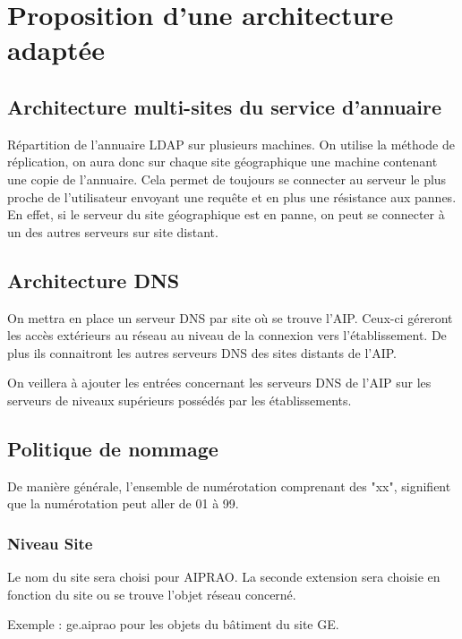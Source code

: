 \section{Proposition d'une architecture adaptée}




\subsection{Architecture multi-sites du service d'annuaire}

Répartition de l'annuaire LDAP sur plusieurs machines. On utilise la méthode de
réplication, on aura donc sur chaque site géographique une machine contenant 
une copie de l'annuaire. Cela permet de toujours se connecter au serveur le 
plus proche de l'utilisateur envoyant une requête et en plus une résistance 
aux pannes. En effet, si le serveur du site géographique est en panne, on peut
se connecter à un des autres serveurs sur site distant.

\subsection{Architecture DNS}

On mettra en place un serveur DNS par site où se trouve l'AIP. Ceux-ci géreront 
les accès extérieurs au réseau au niveau de la connexion vers l'établissement. 
De plus ils connaitront les autres serveurs DNS des sites distants de l'AIP. 

On veillera à ajouter les entrées concernant les serveurs DNS de l'AIP sur les 
serveurs de niveaux supérieurs possédés par les établissements. 

\subsection{Politique de nommage}

De manière générale, l'ensemble de numérotation comprenant des "xx", signifient 
que la numérotation peut aller de 01 à 99.

\subsubsection{Niveau Site}

Le nom du site sera choisi pour AIPRAO. La seconde extension sera choisie en fonction
du site ou se trouve l'objet réseau concerné. 

Exemple : ge.aiprao pour les objets du bâtiment du site GE. 

